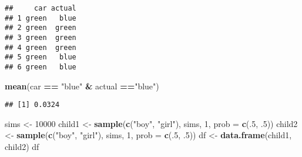 \documentclass[
]{article}
\newenvironment{Shaded}{\begin{snugshade}}{\end{snugshade}}
\newcommand{\AttributeTok}[1]{\textcolor[rgb]{0.13,0.29,0.53}{#1}}
\newcommand{\DecValTok}[1]{\textcolor[rgb]{0.00,0.00,0.81}{#1}}
\newcommand{\FunctionTok}[1]{\textcolor[rgb]{0.13,0.29,0.53}{\textbf{#1}}}
\newcommand{\NormalTok}[1]{#1}
\newcommand{\OtherTok}[1]{\textcolor[rgb]{0.56,0.35,0.01}{#1}}
\newcommand{\SpecialCharTok}[1]{\textcolor[rgb]{0.81,0.36,0.00}{\textbf{#1}}}
\newcommand{\StringTok}[1]{\textcolor[rgb]{0.31,0.60,0.02}{#1}}
\begin{document}
\begin{verbatim}
##     car actual
## 1 green   blue
## 2 green  green
## 3 green  green
## 4 green  green
## 5 green   blue
## 6 green   blue
\end{verbatim}

\begin{Shaded}
\begin{Highlighting}[]
\FunctionTok{mean}\NormalTok{(car }\SpecialCharTok{==} \StringTok{"blue"} \SpecialCharTok{\&}\NormalTok{ actual }\SpecialCharTok{==}\StringTok{"blue"}\NormalTok{)}
\end{Highlighting}
\end{Shaded}

\begin{verbatim}
## [1] 0.0324
\end{verbatim}

\begin{Shaded}
\begin{Highlighting}[]
\NormalTok{sims }\OtherTok{\textless{}{-}} \DecValTok{10000}
\NormalTok{child1 }\OtherTok{\textless{}{-}} \FunctionTok{sample}\NormalTok{(}\FunctionTok{c}\NormalTok{(}\StringTok{"boy"}\NormalTok{, }\StringTok{"girl"}\NormalTok{), sims, }\DecValTok{1}\NormalTok{, }\AttributeTok{prob =} \FunctionTok{c}\NormalTok{(.}\DecValTok{5}\NormalTok{, .}\DecValTok{5}\NormalTok{))}
\NormalTok{child2 }\OtherTok{\textless{}{-}} \FunctionTok{sample}\NormalTok{(}\FunctionTok{c}\NormalTok{(}\StringTok{"boy"}\NormalTok{, }\StringTok{"girl"}\NormalTok{), sims, }\DecValTok{1}\NormalTok{, }\AttributeTok{prob =} \FunctionTok{c}\NormalTok{(.}\DecValTok{5}\NormalTok{, .}\DecValTok{5}\NormalTok{))}
\NormalTok{df }\OtherTok{\textless{}{-}} \FunctionTok{data.frame}\NormalTok{(child1, child2)}
\NormalTok{df}
\end{Highlighting}
\end{Shaded}
\end{document}
